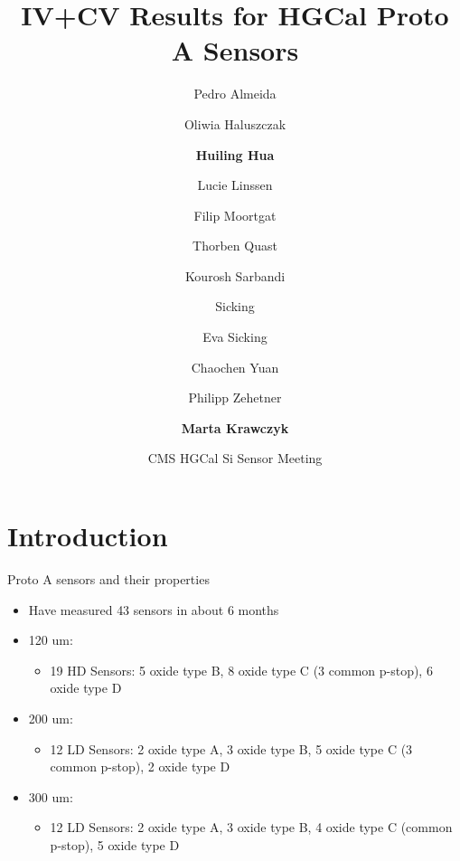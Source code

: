 \documentclass{beamer}
\title[huilng.hua@cern.ch] %
{IV+CV Results for HGCal Proto A Sensors}
\author[Huiling Hua] %
{ Pedro Almeida\and Oliwia Haluszczak\and \textbf{Huiling Hua} \and Lucie Linssen\and Filip Moortgat\and Thorben Quast\and Kourosh Sarbandi\and Sicking\and Eva Sicking\and
Chaochen Yuan\and Philipp Zehetner\and \textbf{Marta Krawczyk} }
\date[2022.02.10] %
{CMS HGCal Si Sensor Meeting}
\begin{document}
\begin{frame}
  \titlepage
\end{frame}

\section{Introduction}
\begin{frame}{Proto A sensors and their properties}
  \begin{itemize}
        \item Have measured \alert{43 sensors} in about 6 months 
      \item 120 um:
      \begin{itemize} 
        \item \alert{19 HD} Sensors: 5 oxide type B, 8 oxide type C (3 common p-stop), 6 oxide type D
      \end{itemize}
      \item 200 um:
      \begin{itemize} 
        \item \alert{12 LD} Sensors: 2 oxide type A, 3 oxide type B, 5 oxide type C (3 common p-stop), 2 oxide type D
      \end{itemize}
      \item 300 um:
      \begin{itemize} 
        \item \alert{12 LD} Sensors: 2 oxide type A, 3 oxide type B, 4 oxide type C (common p-stop), 5 oxide type D
      \end{itemize}
  \end{itemize}
\end{frame}
\end{document}
